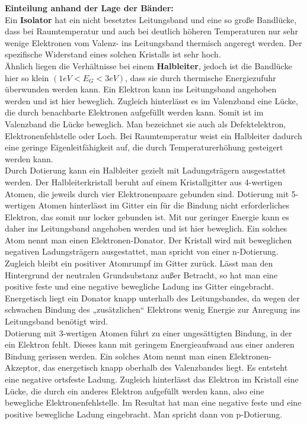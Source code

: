\documentclass[12pt]{article}
\begin{document}
\textbf{Einteilung anhand der Lage der Bänder:} \\

Ein \textbf{Isolator} hat ein nicht besetztes Leitungsband und eine so große Bandlücke, dass bei Raumtemperatur und auch bei
deutlich höheren Temperaturen nur sehr wenige Elektronen vom Valenz- ins Leitungsband thermisch angeregt werden. Der
spezifische Widerstand eines solchen Kristalls ist sehr hoch.\\

Ähnlich liegen die Verhältnisse bei einem \textbf{Halbleiter}, jedoch ist die Bandlücke hier so klein $(1 eV < E_G < 3 eV)$,
dass sie durch thermische Energiezufuhr überwunden werden kann. Ein Elektron kann ins Leitungsband angehoben werden und ist
hier beweglich. Zugleich hinterlässt es im Valenzband eine Lücke, die durch benachbarte Elektronen aufgefüllt werden kann.
Somit ist im Valenzband die Lücke beweglich. Man bezeichnet sie auch als Defektelektron, Elektronenfehlstelle oder Loch. Bei
Raumtemperatur weist ein Halbleiter dadurch eine geringe Eigenleitfähigkeit auf, die durch Temperaturerhöhung gesteigert
werden kann. \\

Durch Dotierung kann ein Halbleiter gezielt mit Ladungsträgern ausgestattet werden. Der Halbleiterkristall beruht auf einem
Kristallgitter aus 4-wertigen Atomen, die jeweils durch vier Elektronenpaare gebunden sind. Dotierung mit 5-wertigen Atomen
hinterlässt im Gitter ein für die Bindung nicht erforderliches Elektron, das somit nur locker gebunden ist. Mit nur geringer
Energie kann es daher ins Leitungsband angehoben werden und ist hier beweglich. Ein solches Atom nennt man einen
Elektronen-Donator. Der Kristall wird mit beweglichen negativen Ladungsträgern ausgestattet, man spricht von einer
n-Dotierung. Zugleich bleibt ein positiver Atomrumpf im Gitter zurück. Lässt man den Hintergrund der neutralen Grundsubstanz
außer Betracht, so hat man eine positive feste und eine negative bewegliche Ladung ins Gitter eingebracht. Energetisch liegt
ein Donator knapp unterhalb des Leitungsbandes, da wegen der schwachen Bindung des „zusätzlichen“ Elektrons wenig Energie zur Anregung ins Leitungsband benötigt wird. \\

Dotierung mit 3-wertigen Atomen führt zu einer ungesättigten Bindung, in der ein Elektron fehlt. Dieses kann mit geringem
Energieaufwand aus einer anderen Bindung gerissen werden. Ein solches Atom nennt man einen Elektronen-Akzeptor, das
energetisch knapp oberhalb des Valenzbandes liegt. Es entsteht eine negative ortsfeste Ladung. Zugleich hinterlässt das
Elektron im Kristall eine Lücke, die durch ein anderes Elektron aufgefüllt werden kann, also eine bewegliche
Elektronenfehlstelle. Im Resultat hat man eine negative feste und eine positive bewegliche Ladung eingebracht.
Man spricht dann von p-Dotierung.\\
\end{document}
